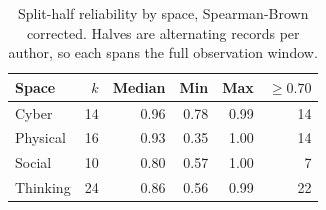 \begin{table}[!t]
\caption{Split-half reliability by space, Spearman-Brown corrected. Halves are
alternating records per author, so each spans the full observation window.}
\label{tab:reliability}
\centering
\begin{tabular}{lrrrrr}
\toprule
Space & $k$ & Median & Min & Max & $\geq 0.70$ \\
\midrule
Cyber & 14 & 0.96 & 0.78 & 0.99 & 14 \\
Physical & 16 & 0.93 & 0.35 & 1.00 & 14 \\
Social & 10 & 0.80 & 0.57 & 1.00 & 7 \\
Thinking & 24 & 0.86 & 0.56 & 0.99 & 22 \\
\bottomrule
\end{tabular}
\end{table}

